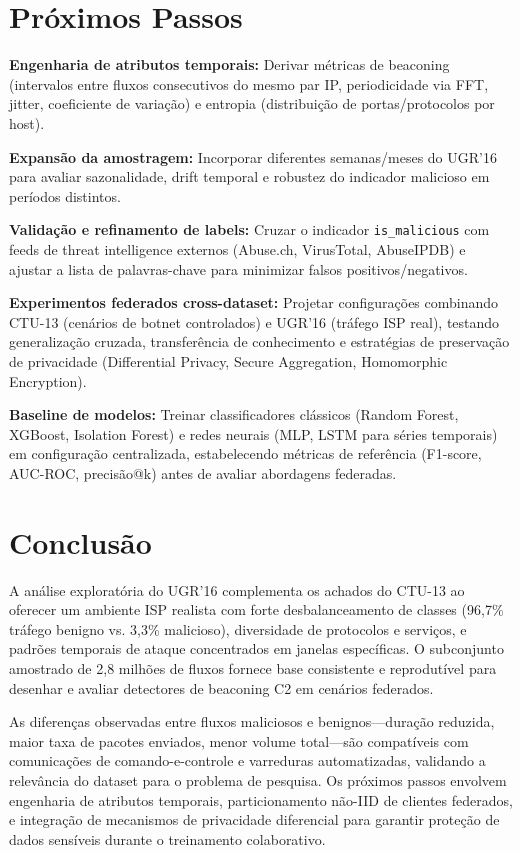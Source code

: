 \documentclass[a4paper, 12pt]{article}
\begin{document}
\section{Próximos Passos}
\begin{compactitem}
    \item \textbf{Engenharia de atributos temporais:} Derivar métricas de beaconing (intervalos entre fluxos consecutivos do mesmo par IP, periodicidade via FFT, jitter, coeficiente de variação) e entropia (distribuição de portas/protocolos por host).
    
    \item \textbf{Expansão da amostragem:} Incorporar diferentes semanas/meses do UGR'16 para avaliar sazonalidade, drift temporal e robustez do indicador malicioso em períodos distintos.
    
    \item \textbf{Validação e refinamento de labels:} Cruzar o indicador \texttt{is\_malicious} com feeds de threat intelligence externos (Abuse.ch, VirusTotal, AbuseIPDB) e ajustar a lista de palavras-chave para minimizar falsos positivos/negativos.
    
    \item \textbf{Experimentos federados cross-dataset:} Projetar configurações combinando CTU-13 (cenários de botnet controlados) e UGR'16 (tráfego ISP real), testando generalização cruzada, transferência de conhecimento e estratégias de preservação de privacidade (Differential Privacy, Secure Aggregation, Homomorphic Encryption).
    
    \item \textbf{Baseline de modelos:} Treinar classificadores clássicos (Random Forest, XGBoost, Isolation Forest) e redes neurais (MLP, LSTM para séries temporais) em configuração centralizada, estabelecendo métricas de referência (F1-score, AUC-ROC, precisão@k) antes de avaliar abordagens federadas.
\end{compactitem}

\section{Conclusão}
A análise exploratória do UGR'16 complementa os achados do CTU-13 ao oferecer um ambiente ISP realista com forte desbalanceamento de classes (96{,}7\% tráfego benigno vs. 3{,}3\% malicioso), diversidade de protocolos e serviços, e padrões temporais de ataque concentrados em janelas específicas. O subconjunto amostrado de 2{,}8 milhões de fluxos fornece base consistente e reprodutível para desenhar e avaliar detectores de beaconing C2 em cenários federados.

As diferenças observadas entre fluxos maliciosos e benignos---duração reduzida, maior taxa de pacotes enviados, menor volume total---são compatíveis com comunicações de comando-e-controle e varreduras automatizadas, validando a relevância do dataset para o problema de pesquisa. Os próximos passos envolvem engenharia de atributos temporais, particionamento não-IID de clientes federados, e integração de mecanismos de privacidade diferencial para garantir proteção de dados sensíveis durante o treinamento colaborativo.
\end{document}
